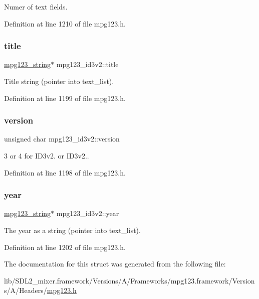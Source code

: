 Numer of text fields. 

Definition at line 1210 of file mpg123.\+h.

\mbox{\label{structmpg123__id3v2_a287e2a93e889c4a9b60b634a4dee4f13}} 
\subsubsection{\texorpdfstring{title}{title}}
{\footnotesize\ttfamily \mbox{\hyperlink{structmpg123__string}{mpg123\+\_\+string}}$\ast$ mpg123\+\_\+id3v2\+::title}

Title string (pointer into text\+\_\+list). 

Definition at line 1199 of file mpg123.\+h.

\mbox{\label{structmpg123__id3v2_ab64e67e2d2bc5cc0b45e9598a8d386d6}} 
\subsubsection{\texorpdfstring{version}{version}}
{\footnotesize\ttfamily unsigned char mpg123\+\_\+id3v2\+::version}

3 or 4 for I\+D3v2. or I\+D3v2.. 

Definition at line 1198 of file mpg123.\+h.

\mbox{\label{structmpg123__id3v2_a6b2125b4b38019370646be4dc4a9ad23}} 
\subsubsection{\texorpdfstring{year}{year}}
{\footnotesize\ttfamily \mbox{\hyperlink{structmpg123__string}{mpg123\+\_\+string}}$\ast$ mpg123\+\_\+id3v2\+::year}

The year as a string (pointer into text\+\_\+list). 

Definition at line 1202 of file mpg123.\+h.



The documentation for this struct was generated from the following file\+:\begin{DoxyCompactItemize}
\item 
lib/\+S\+D\+L2\+\_\+mixer.\+framework/\+Versions/\+A/\+Frameworks/mpg123.\+framework/\+Versions/\+A/\+Headers/\mbox{\hyperlink{mpg123_8h}{mpg123.\+h}}\end{DoxyCompactItemize}
